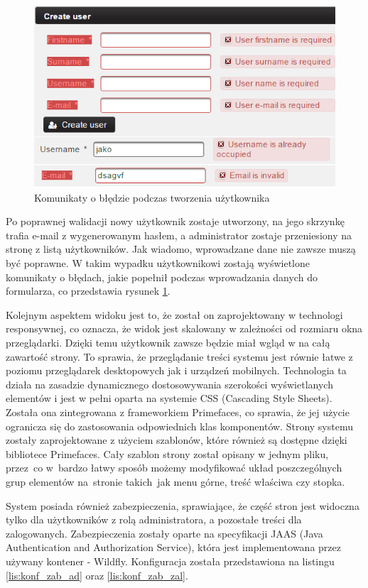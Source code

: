 \begin{figure}[t]
	\centering
	\includegraphics[width=15cm]{rysunki/user-blad.png}	
	\caption{Komunikaty o błędzie podczas tworzenia użytkownika}
	\label{fig:user-blad}
\end{figure}

Po poprawnej walidacji nowy użytkownik zostaje utworzony, na jego skrzynkę trafia e-mail z wygenerowanym hasłem, a administrator zostaje przeniesiony na stronę z listą użytkowników. Jak wiadomo, wprowadzane dane nie zawsze muszą być poprawne. W takim wypadku użytkownikowi zostają wyświetlone komunikaty o błędach, jakie popełnił podczas wprowadzania danych do formularza, co przedstawia rysunek \ref{fig:user-blad}.

Kolejnym aspektem widoku jest to, że został on zaprojektowany w technologi responsywnej, co oznacza, że widok jest skalowany w zależności od rozmiaru okna przeglądarki. Dzięki temu użytkownik zawsze będzie miał wgląd w na całą zawartość strony. To sprawia, że przeglądanie treści systemu jest równie łatwe z poziomu przeglądarek desktopowych jak i urządzeń mobilnych. Technologia ta działa na zasadzie dynamicznego dostosowywania szerokości wyświetlanych elementów i jest w pełni oparta na systemie CSS (Cascading Style Sheets). Została ona zintegrowana z frameworkiem Primefaces, co sprawia, że jej użycie ogranicza się do zastosowania odpowiednich klas komponentów. Strony systemu zostały zaprojektowane z użyciem szablonów, które również są dostępne dzięki bibliotece Primefaces. Cały szablon strony został opisany w jednym pliku, przez~co w~bardzo łatwy sposób możemy modyfikować układ poszczególnych grup elementów na~stronie takich~jak menu górne, treść właściwa czy stopka.

System posiada również zabezpieczenia, sprawiające, że część stron jest widoczna tylko dla użytkowników z rolą administratora, a pozostałe treści dla zalogowanych. Zabezpieczenia zostały oparte na specyfikacji JAAS (Java Authentication and Authorization Service), która jest implementowana przez używany kontener - Wildfly. Konfiguracja została przedstawiona na listingu \ref{lis:konf_zab_ad} oraz \ref{lis:konf_zab_zal}.

